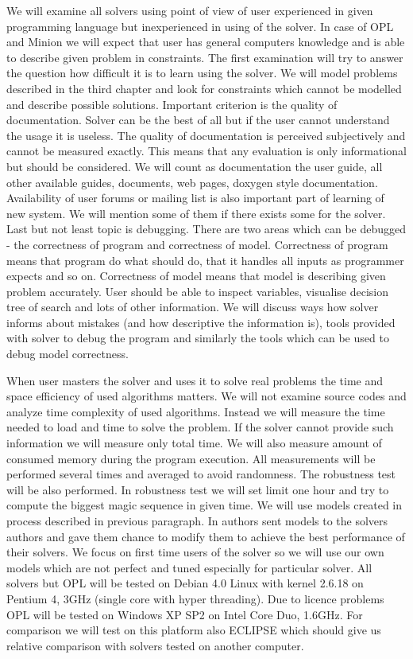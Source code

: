 We will examine all solvers using point of view of user experienced in given 
programming language but inexperienced in using of the solver. In case of OPL 
and Minion we will expect that user has general computers knowledge and is able 
to describe given problem in constraints. The first examination will try to answer 
the question how difficult it is to learn using the solver. We will model problems 
described in the third chapter and look for constraints which cannot be modelled 
and describe possible solutions.  Important criterion is the quality of documentation. 
Solver can be the best of all but if the user cannot understand the usage it is useless. 
The quality of documentation is perceived subjectively and cannot be measured 
exactly. This means that any evaluation is only informational but should be 
considered. We will count as documentation the user guide, all other available 
guides, documents, web pages, doxygen style documentation. Availability of user 
forums or mailing list is also important part of learning of new system. We will 
mention some of them if there exists some for the solver. Last but not least topic 
is debugging. There are two areas which can be debugged - the correctness of program 
and correctness of model. Correctness of program means that program do what should do, 
that it handles all inputs as programmer expects and so on. Correctness of model 
means that model is describing given problem accurately. User should be able to 
inspect variables, visualise decision tree of search and lots of other information. 
We will discuss ways how solver informs about mistakes (and how descriptive the 
information is), tools provided with solver to debug the program and similarly the 
tools which can be used to debug model correctness.

When user masters the solver and uses it to solve real problems the time and space 
efficiency of used algorithms matters. We will not examine source codes and analyze 
time complexity of used algorithms. Instead we will measure the time needed to 
load and time to solve the problem. If the solver cannot provide such information 
we will measure only total time. We will also measure amount of consumed memory 
during the program execution. All measurements will be performed several times 
and averaged to avoid randomness. The robustness test will be also performed. 
In robustness test we will set limit one hour and try to compute the biggest magic 
sequence in given time. We will use models created in process described in previous 
paragraph. In \cite{fernandez00} authors sent models to the solvers authors and 
gave them chance to modify them to achieve the best performance of their solvers. 
We focus on first time users of the solver so we will use our own models which are 
not perfect and tuned especially for particular solver. All solvers but OPL will 
be tested on Debian 4.0  Linux with kernel 2.6.18 on Pentium 4, 3GHz (single core 
with hyper threading). Due to licence problems OPL will be tested on Windows XP 
SP2 on Intel Core Duo, 1.6GHz. For comparison we will test on this platform also 
ECLIPSE which should give us relative comparison with solvers tested on another 
computer.

